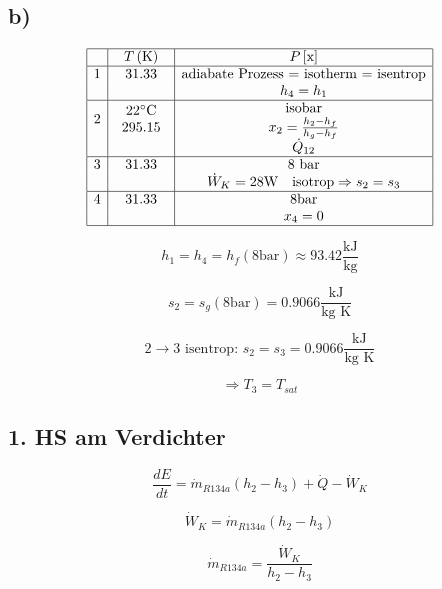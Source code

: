 

\subsection*{b)}

\[
\begin{array}{|c|c|c|}
\hline
 & T \left( \text{K} \right) & P \left[ \text{x} \right] \\
\hline
1 & 31.33 & \text{adiabate Prozess = isotherm = isentrop} \\
 & & h_4 = h_1 \\
\hline
2 & \begin{array}{c} 22^\circ \text{C} \\ 295.15 \end{array} & \begin{array}{c} \text{isobar} \\ x_2 = \frac{h_2 - h_f}{h_g - h_f} \end{array} \\
 & & \dot{Q}_{12} \\
\hline
3 & 31.33 & \text{8 bar} \\
 & & \dot{W}_K = 28 \text{W} \quad \text{isotrop} \Rightarrow s_2 = s_3 \\
\hline
4 & 31.33 & 8 \text{bar} \\
 & & x_4 = 0 \\
\hline
\end{array}
\]

\[
h_1 = h_4 = h_f (8 \text{bar}) \approx 93.42 \frac{\text{kJ}}{\text{kg}}
\]

\[
s_2 = s_g (8 \text{bar}) = 0.9066 \frac{\text{kJ}}{\text{kg K}}
\]

\[
2 \rightarrow 3 \text{ isentrop: } s_2 = s_3 = 0.9066 \frac{\text{kJ}}{\text{kg K}}
\]

\[
\Rightarrow T_3 = T_{sat}
\]

\subsection*{1. HS am Verdichter}

\[
\frac{dE}{dt} = \dot{m}_{R134a} (h_2 - h_3) + \dot{Q} - \dot{W}_K
\]

\[
\dot{W}_K = \dot{m}_{R134a} (h_2 - h_3)
\]

\[
\dot{m}_{R134a} = \frac{\dot{W}_K}{h_2 - h_3}
\]